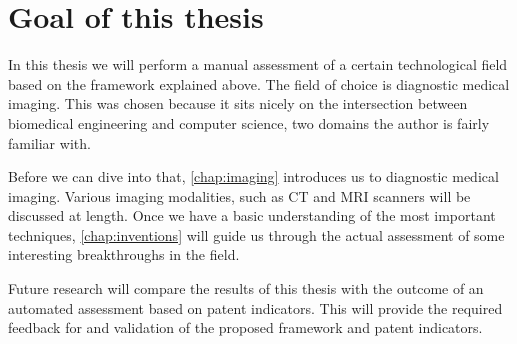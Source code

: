 \section{Goal of this thesis}
In this thesis we will perform a manual assessment of a certain technological
field based on the framework explained above. The field of choice is diagnostic
medical imaging. This was chosen because it sits nicely on the intersection
between biomedical engineering and computer science, two domains the author is
fairly familiar with.

Before we can dive into that, \autoref{chap:imaging} introduces us to
diagnostic medical imaging. Various imaging modalities, such as CT and MRI
scanners will be discussed at length. Once we have a basic understanding of the
most important techniques, \autoref{chap:inventions} will guide us through the
actual assessment of some interesting breakthroughs in the field.

Future research will compare the results of this thesis with the outcome of an
automated assessment based on patent indicators. This will provide the required
feedback for and validation of the proposed framework and patent indicators.

